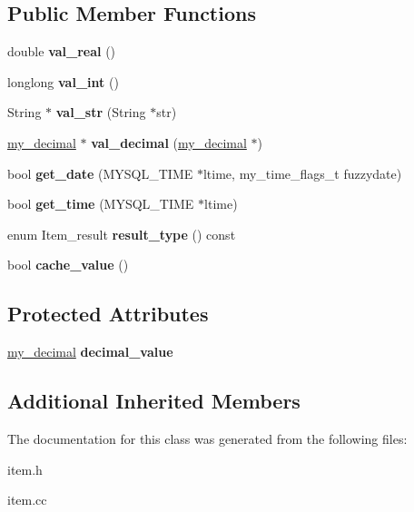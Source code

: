 \subsection*{Public Member Functions}
\begin{DoxyCompactItemize}
\item 
\mbox{\label{classItem__cache__decimal_adb6477bc257589cc1271b529b2f26e81}} 
double {\bfseries val\+\_\+real} ()
\item 
\mbox{\label{classItem__cache__decimal_a3f4e1a74f22010ea1a33c02ce9d4affc}} 
longlong {\bfseries val\+\_\+int} ()
\item 
\mbox{\label{classItem__cache__decimal_a76cea6251baf32d2d6ac0281907d8107}} 
String $\ast$ {\bfseries val\+\_\+str} (String $\ast$str)
\item 
\mbox{\label{classItem__cache__decimal_a6a432790505908006f30bbad1079ce44}} 
\mbox{\hyperlink{classmy__decimal}{my\+\_\+decimal}} $\ast$ {\bfseries val\+\_\+decimal} (\mbox{\hyperlink{classmy__decimal}{my\+\_\+decimal}} $\ast$)
\item 
\mbox{\label{classItem__cache__decimal_a02ea925b5b9ff071faebbc2ed20f2531}} 
bool {\bfseries get\+\_\+date} (M\+Y\+S\+Q\+L\+\_\+\+T\+I\+ME $\ast$ltime, my\+\_\+time\+\_\+flags\+\_\+t fuzzydate)
\item 
\mbox{\label{classItem__cache__decimal_a2076683c17c2a9620400d99993c552bb}} 
bool {\bfseries get\+\_\+time} (M\+Y\+S\+Q\+L\+\_\+\+T\+I\+ME $\ast$ltime)
\item 
\mbox{\label{classItem__cache__decimal_ac6dbe502b002ec466d1db174ec17554d}} 
enum Item\+\_\+result {\bfseries result\+\_\+type} () const
\item 
\mbox{\label{classItem__cache__decimal_ad5cf1bb757ba372bb397e3cee8f77665}} 
bool {\bfseries cache\+\_\+value} ()
\end{DoxyCompactItemize}
\subsection*{Protected Attributes}
\begin{DoxyCompactItemize}
\item 
\mbox{\label{classItem__cache__decimal_a1f8a1e60e25b6917098255c202071cbb}} 
\mbox{\hyperlink{classmy__decimal}{my\+\_\+decimal}} {\bfseries decimal\+\_\+value}
\end{DoxyCompactItemize}
\subsection*{Additional Inherited Members}


The documentation for this class was generated from the following files\+:\begin{DoxyCompactItemize}
\item 
item.\+h\item 
item.\+cc\end{DoxyCompactItemize}
